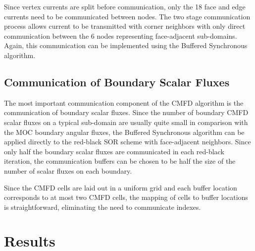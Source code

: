 Since vertex currents are split before communication, only the 18 face and edge currents need to be communicated between nodes. The two stage communication process allows current to be transmitted with corner neighbors with only direct communication between the 6 nodes representing face-adjacent sub-domains. Again, this communication can be implemented using the Buffered Synchronous algorithm.

\subsection{Communication of Boundary Scalar Fluxes}

The most important communication component of the \ac{CMFD} algorithm is the communication of boundary scalar fluxes. Since the number of boundary \ac{CMFD} scalar fluxes on a typical sub-domain are usually quite small in comparison with the \ac{MOC} boundary angular fluxes, the Buffered Synchronous algorithm can be applied directly to the red-black SOR scheme with face-adjacent neighbors. Since only half the boundary scalar fluxes are communicated in each red-black iteration, the communication buffers can be chosen to be half the size of the number of scalar fluxes on each boundary.

Since the \ac{CMFD} cells are laid out in a uniform grid and each buffer location corresponds to at most two \ac{CMFD} cells, the mapping of cells to buffer locations is straightforward, eliminating the need to communicate indexes.

\section{Results}